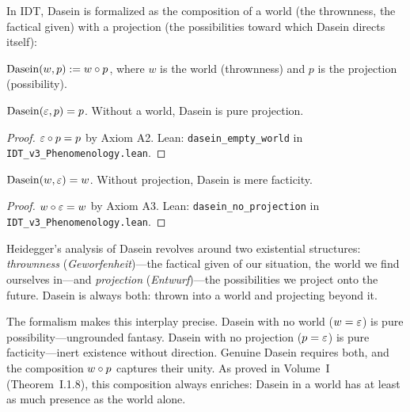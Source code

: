 In IDT, Dasein is formalized as the composition of a world (the thrownness,
the factical given) with a projection (the possibilities toward which Dasein
directs itself):

\begin{definition}[Dasein]
\label{def:dasein}
$\mathrm{Dasein}(w, p) := w \circ p$, where $w$ is the world
(thrownness) and $p$ is the projection (possibility).
\end{definition}

\begin{theorem}
\label{thm:dasein-empty}
$\mathrm{Dasein}(\varepsilon, p) = p$. Without a world, Dasein is pure projection.
\end{theorem}

\begin{proof}
$\varepsilon \circ p = p$ by Axiom A2.
Lean: \texttt{dasein\_empty\_world} in \texttt{IDT\_v3\_Phenomenology.lean}.
\end{proof}

\begin{theorem}
\label{thm:dasein-no-projection}
$\mathrm{Dasein}(w, \varepsilon) = w$. Without projection, Dasein is mere facticity.
\end{theorem}

\begin{proof}
$w \circ \varepsilon = w$ by Axiom A3.
Lean: \texttt{dasein\_no\_projection} in \texttt{IDT\_v3\_Phenomenology.lean}.
\end{proof}

\begin{interpretation}
\label{interp:thrownness-projection}
Heidegger's analysis of Dasein revolves around two existential structures:
\emph{thrownness} (\textit{Geworfenheit})---the factical given of our
situation, the world we find ourselves in---and \emph{projection}
(\textit{Entwurf})---the possibilities we project onto the future. Dasein is
always both: thrown into a world and projecting beyond it.

The formalism makes this interplay precise. Dasein with no world ($w = \varepsilon$)
is pure possibility---ungrounded fantasy. Dasein with no projection ($p = \varepsilon$)
is pure facticity---inert existence without direction. Genuine Dasein requires
both, and the composition $w \circ p$ captures their unity. As proved in
Volume~I (Theorem~I.1.8), this composition always enriches: Dasein in a world
has at least as much presence as the world alone.
\end{interpretation}

